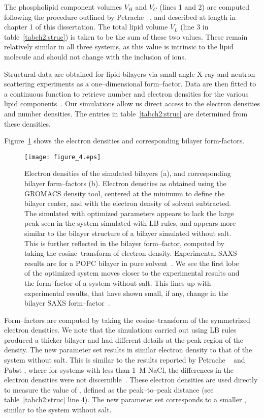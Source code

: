 The phospholipid component volumes $V_H$ and $V_C$ (lines 1 and 2) are
computed following the procedure outlined by Petrache \etal~\cite{petrache:1997}, and described at length in chapter 1 of this dissertation. 
The total lipid volume $V_L$ (line 3 in table~\ref{tabch2:struc}) 
is taken to be the sum of these two values. 
These remain relatively similar in all three systems, 
as this value is intrinsic to the lipid molecule 
and should not change with the inclusion of ions.

Structural data are obtained for lipid bilayers via small angle X-ray and neutron scattering
experiments as a one--dimensional form--factor. Data are then
fitted to a continuous function to retrieve number and electron
densities for the various lipid components~\cite{nagle:2000,fogarty:2015}. 
Our simulations allow us direct access to the electron densities and number densities. 
The entries in table~\ref{tabch2:struc} are determined from these densities.

Figure~\ref{figch2:eldens} shows the electron densities and corresponding bilayer form-factors.
\begin{figure}[h!tb]
    \caption[Electron densities of the simulated bilayers]{Electron densities of the simulated bilayers (a), and corresponding bilayer form--factors (b).
        Electron densities as obtained using the GROMACS density tool,
    centered at the minimum to define the bilayer center, and with the electron density of solvent subtracted.
    The simulated with optimized parameters appears to lack the large peak seen in the system simulated
    with LB rules, and appears more similar to the
bilayer structure of a bilayer simulated without salt. 
This is further reflected in the bilayer form--factor, 
computed by taking the cosine--transform of electron density. Experimental
SAXS results are for a POPC bilayer in pure solvent~\cite{fogarty:2015}. We see the first lobe
of the optimized system moves closer to the experimental results and the form--factor of a system without salt. This lines up with experimental results, that have shown small, if any, change
in the bilayer SAXS form--factor~\cite{pabst:2007,petrache:2006:swelling,uhrikova:2008}.}
    \label{figch2:eldens}
    \texttt{[image: figure\_4.eps]}
\end{figure}
Form--factors are computed by taking the cosine--transform of the symmetrized electron densities.   
We note that the simulations carried out using LB rules produced a
thicker bilayer and had different details at the peak region of the density. 
The new parameter set results in similar electron density to that of the system without salt.
This is similar to the results reported by Petrache
\etal~ and Pabst \etal, where for systems with less than 1~M NaCl, 
the differences in the electron densities were not
discernible~\cite{petrache:2006:swelling,pabst:2007}. 
These electron densities are used directly to measure the value of \dhh, 
defined as the peak--to--peak distance (see table~\ref{tabch2:struc} line 4). 
The new parameter set corresponds to a smaller \dhh, similar to the system without salt.

